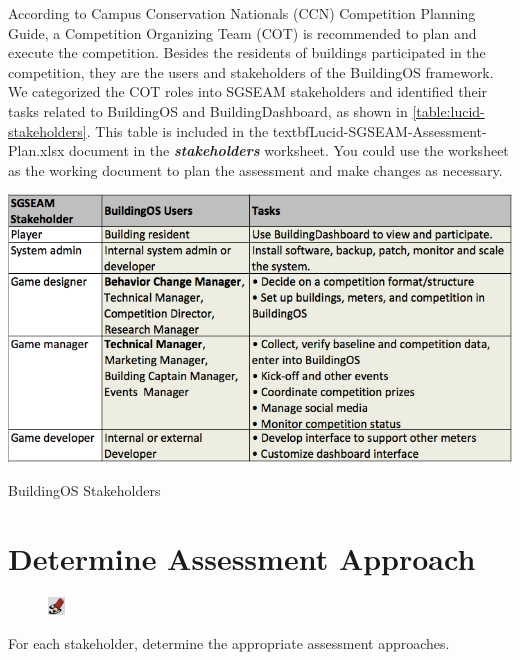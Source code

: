 \documentclass[11pt,oneside]{book}
\begin{document}
According to Campus Conservation Nationals (CCN) Competition Planning Guide, a Competition Organizing Team (COT) is recommended to plan and execute the competition. Besides the residents of buildings participated in the competition, they are the users and stakeholders of the BuildingOS framework. We categorized the COT roles into SGSEAM stakeholders and identified their tasks related to BuildingOS and BuildingDashboard, as shown in \autoref{table:lucid-stakeholders}. This table is included in the textbf{Lucid-SGSEAM-Assessment-Plan.xlsx} document in the \textbf{\textit{stakeholders}} worksheet. You could use the worksheet as the working document to plan the assessment and make changes as necessary. 
\newline
\newline
\newline

\begin{table}[ht!]
  \center
  \includegraphics[width=0.8\columnwidth]{stakeholder}
  \caption{BuildingOS Stakeholders}
  \label{table:lucid-stakeholders}
\end{table}

\section{Determine Assessment Approach}
\label{sect:Assessment Approach}

\begin{shadebox}
\begin{figure}
\vspace{-15pt}\hspace{-10pt}
    \includegraphics[width=0.04\textwidth]{note-icon}
\end{figure}
For each stakeholder, determine the appropriate assessment approaches.
\end{shadebox}
\end{document}
